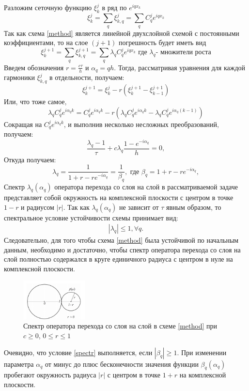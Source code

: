 \documentclass[12pt,a4paper]{scrartcl}
\begin{document}
	Разложим сеточную функцию $\xi^j_k$ в ряд по $e^{iqx_k}$
	\[
	\xi^j_k = \sum_q \xi^j_{k,q}=\sum_q C_q^j e^{iqx_k}   
	\]
	Так как схема \eqref{method} является линейной двухслойной схемой с постоянными коэффициентами, то на слое $(j + 1)$ погрешность будет иметь вид
	\[
	\xi^{j+1}_k = \sum_q \xi^{j+1}_{k,q}=\sum_q \lambda_q C_q^j e^{iqx_k} \text{ где } \lambda_q \text{- множители роста}
	\]
	Введем обозначения $r=\frac{c \tau}{h}$ и $\alpha_q = qh$. Тогда, рассматривая уравнения для каждой гармоники $\xi^{j}_{k,q}$ в отдельности, получаем:
	\[
	\xi^{j+1}_k = \xi^j_k - r(\xi^{j+1}_k-\xi^{j+1}_{k-1})
	\]
	Или, что тоже самое,
	\[
	\lambda_q C_q^j e^{i \alpha_q k} = C_q^j e^{i \alpha_q k}-r(\lambda_q C_q^j e^{i \alpha_q k}-\lambda_q C_q^j e^{i \alpha_q (k-1)})
	\]
	Сокращая на $C_q^j e^{i \alpha_q k}$, и выполнив несколько несложных преобразований, получаем:
	\[
	\frac{\lambda_q -1}{\tau}+c \lambda_q \frac{1-e^{-i \alpha_q}}{h}=0,
	\]
	Откуда получаем:
	\[
	\lambda_q = \frac{1}{1+r-re^{-i \alpha_q}}=\frac{1}{\beta_q}, \text{ где } \beta_q = 1+r-re^{-i \alpha_q}, 
	\]
	Спектр $\lambda_q(\alpha_q)$ оператора перехода со слоя на слой в рассматриваемой задаче представляет собой окружность на комплексной плоскости с центром в точке $1 - r$ и радиусом $|r|$. Так как $\lambda_q(\alpha_q)$ не зависит от $\tau$ явным образом, то спектральное условие устойчивости схемы принимает вид:
	\begin{align} \label{spectr}
	| \lambda_q | \le 1, \forall q. 
	\end{align}
	Следовательно, для того чтобы схема \eqref{method} была устойчивой по начальным данным, необходимо и достаточно, чтобы спектр оператора перехода со слоя на слой полностью содержался в круге единичного радиуса с центром в нуле на комплексной плоскости.
	
	\begin{figure}[h]
		\centering
		\includegraphics[width=0.3\textwidth]{picture2.png}
		\caption{Спектр оператора перехода со слоя на слой в схеме \eqref{method} при $c \ge 0$, $0 \le r \le 1$}
		\label{pic2}
	\end{figure}
	
	Очевидно, что условие \eqref{spectr} выполняется, если $| \beta_q| \ge 1$. При изменении параметра $\alpha_q$ от минус до плюс бесконечности значения функции $\beta_q(\alpha_q)$ пробегают окружность радиуса $|r|$ с центром в точке $1 + r$ на комплексной плоскости.
	
\end{document}
